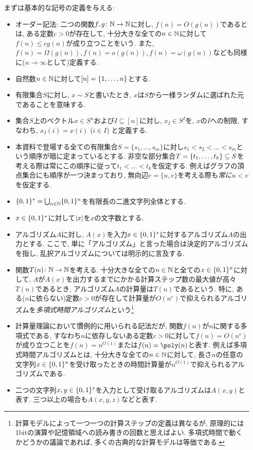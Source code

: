 まずは基本的な記号の定義を与える:
\begin{itemize}
\item オーダー記法: 二つの関数$f,g\colon\mathbb{N}\to\mathbb{N}$に対し, $f(n)=O(g(n))$であるとは, ある定数$c>0$が存在して, 十分大きな全ての$n\in\mathbb{N}$に対して$f(n)\le cg(n)$が成り立つことをいう. また, $f(n)=\Omega(g(n)), f(n)=o(g(n)), f(n)=\omega(g(n))$なども同様に($n\to\infty$として)定義する.
\item 自然数$n\in\mathbb{N}$に対して$[n]=\qty{1,\dots,n}$とする.
\item 有限集合$S$に対し, $x\sim S$と書いたとき, $x$は$S$から一様ランダムに選ばれた元であることを意味する.
\item 集合$S$上のベクトル$x\in S^n$および$I\subseteq[n]$に対し, $x_I \in S^I$を, $x$の$I$への制限, すなわち, $x_I(i)=x(i)$ ($i\in I$) と定義する.
\item 本資料で登場する全ての有限集合$S=\{s_1,\dots,s_m\}$に対し$s_1<s_2<\dots<s_m$という順序が暗に定まっているとする. 非空な部分集合$T=\qty{t_1,\dots,t_k}\subseteq S$を考える際は常にこの順序に従って$t_1<\dots<t_k$を仮定する. 例えばグラフの頂点集合にも順序が一つ決まっており, 無向辺$e=\{u,v\}$を考える際も\emph{常に}$u<v$を仮定する.
\item $\{0,1\}^*=\bigcup_{n\in\mathbb{N}}\{0,1\}^n$を有限長の二進文字列全体とする.
\item $x\in\{0,1\}^*$に対して$\abs{x}$を$x$の文字数とする.
\item アルゴリズム$A$に対し, $A(x)$を入力$x \in \{0,1\}^*$に対するアルゴリズム$A$の出力とする. ここで, 単に「アルゴリズム」と言った場合は決定的アルゴリズムを指し, 乱択アルゴリズムについては明示的に言及する.
\item 関数$T(n)\colon\mathbb{N}\to\mathbb{N}$を考える. 十分大きな全ての$n\in\mathbb{N}$と全ての$x\in\{0,1\}^n$に対して, $A$が$A(x)$を出力するまでにかかる計算ステップ数の最大値が高々$T(n)$であるとき, アルゴリズム$A$の計算量は$T(n)$であるという. 特に, ある($n$に依らない)定数$c>0$が存在して計算量が$O(n^c)$で抑えられるアルゴリズムを\emph{多項式時間アルゴリズム}という\footnote{計算モデルによって一つ一つの計算ステップの定義は異なるが, 原理的には1bitの演算や記憶領域への読み書きの回数と思えばよい. 多項式時間で動くかどうかの議論であれば, 多くの古典的な計算モデルは等価である.}
\item 計算量理論において慣例的に用いられる記法だが, 関数$f(n)$が$n$に関する多項式である, すなわち$n$に依存しないある定数$c>0$に対して$f(n)=O(n^c)$が成り立つことを$f(n)=n^{O(1)}$または$f(n)=\poly(n)$と表す. 例えば多項式時間アルゴリズムとは, 十分大きな全ての$n\in\mathbb{N}$に対して, 長さ$n$の任意の文字列$x\in\{0,1\}^n$を受け取ったときの時間計算量が$n^{O(1)}$で抑えられるアルゴリズムである.
\item 二つの文字列$x,y\in\{0,1\}^*$を入力として受け取るアルゴリズムは$A(x,y)$と表す. 三つ以上の場合も$A(x,y,z)$などと表す.
\end{itemize}

